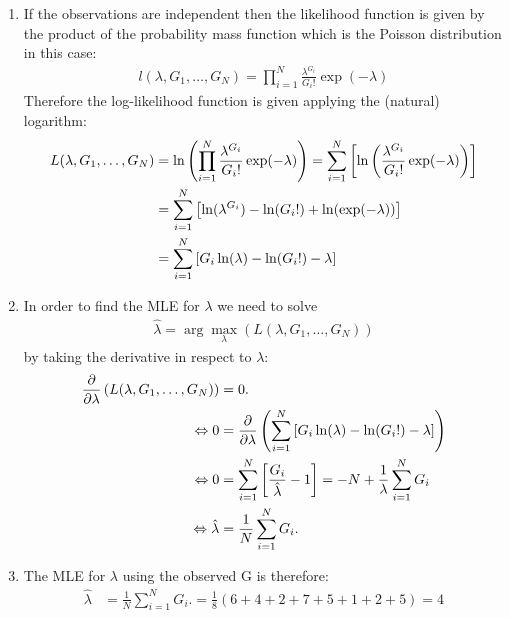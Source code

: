 \documentclass[12pt]{article}
\begin{document}
\begin{enumerate}
	\item If the observations are independent then the likelihood function is given by the product of the probability mass function which is the Poisson distribution in this case:
	\begin{align}
		l(\lambda, G_1,\dots, G_N)=\prod_{i=1}^{N}\frac{\lambda^{G_i}}{G_i!}\exp(-\lambda)
	\end{align}
	Therefore the log-likelihood function is given applying the (natural) logarithm:
	\begin{align}
		L(\lambda, G_1,\dots, G_N)&= \ln\left( \prod_{i=1}^{N}\frac{\lambda^{G_i}}{G_i!}\exp(-\lambda)  \right)= \sum_{i=1}^{N}\left[ \ln\left( \frac{\lambda^{G_i}}{G_i!}\exp(-\lambda) \right) \right] \notag \\
		&= \sum_{i=1}^{N}\left[  \ln(\lambda^{G_i})-\ln(G_i!)+\ln(\exp(-\lambda)) \right] \notag \\
		&= \sum_{i=1}^{N}\left[  G_i\ln(\lambda)-\ln(G_i!)-\lambda\right]
	\end{align}
	\item In order to find the MLE for $\lambda$ we need to solve
	\begin{align}
		\hat{\lambda}=\arg\max_\lambda(L(\lambda, G_1,\dots, G_N))
	\end{align}
	by taking the derivative in respect to $\lambda$:
	\begin{align}
		\frac{\partial}{\partial\lambda}\left( L(\lambda, G_1,\dots, G_N) \right) &= 0. \\ \notag
		\Leftrightarrow
		0 &= \frac{\partial}{\partial\lambda}\left(\sum_{i=1}^{N}\left[  G_i\ln(\lambda)-\ln(G_i!)-\lambda\right]  \right) \notag \\
		\Leftrightarrow
		0 &= \sum_{i=1}^{N}\left[  \frac{G_i}{\hat{\lambda}}-1\right] = -N + \frac{1}{\lambda}\sum_{i=1}^{N}G_i \notag \\
		\Leftrightarrow
		\hat{\lambda} &= \frac{1}{N}\sum_{i=1}^{N}G_i. 
	\end{align}
	\item The MLE for $\lambda$ using the observed G is therefore:
	\begin{align}
		\hat{\lambda} &= \frac{1}{N}\sum_{i=1}^{N}G_i. = \frac{1}{8}\left( 6+4+2+7+5+1+2+5 \right) = 4
	\end{align}
	
\end{enumerate}



%	



\end{document}
